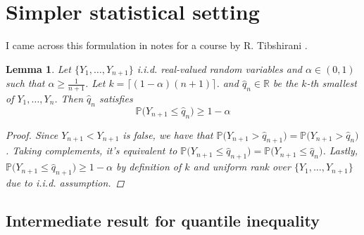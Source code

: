 \documentclass[a4paper, 12pt]{article}
\newtheorem{definition}{Definition}
\newtheorem{lemma}{Lemma}
\newtheorem{example}{Example}
\newcommand{\R}{\mathbb{R}}
\def\P{\mathbb{P}}
\begin{document}


\section*{Simpler statistical setting}

I came across this formulation in notes for a course by R. Tibshirani
\cite{tibshirani_stat_2023}.


\begin{lemma}
  \label{cp_simpler}
  Let $\{Y_1,\ldots,Y_{n+1}\}$
  i.i.d. real-valued random variables
  and $\alpha\in (0, 1)$
  such that $\alpha\ge \frac{1}{n+1}$.
  Let $k=\lceil (1-\alpha)(n+1) \rceil$.
  and $\hat{q}_n \in \R$ be the
  $k$-th smallest of $Y_1,\ldots,Y_n$.
  Then $\hat{q}_n$ satisfies
  $$\P\big( Y_{n+1} \le \hat{q}_n \big) \ge 1-\alpha$$
\begin{proof}
  Since $Y_{n+1}<Y_{n+1}$ is false,
  we have that $\P\big( Y_{n+1}>\hat{q}_{n+1} \big) = \P\big( Y_{n+1}>\hat{q}_{n} \big)$.
  Taking complements,
  it's equivalent to $\P\big( Y_{n+1}\le\hat{q}_{n+1} \big) = \P\big( Y_{n+1}\le\hat{q}_{n} \big)$.
  Lastly, $\P\big( Y_{n+1}\le\hat{q}_{n+1} \big)\ge 1-\alpha$ by definition of $k$
  and uniform rank over $\{Y_1,\ldots,Y_{n+1}\}$ due to i.i.d. assumption.
\end{proof}
\end{lemma}

\subsection*{Intermediate result for quantile inequality}
\end{document}
